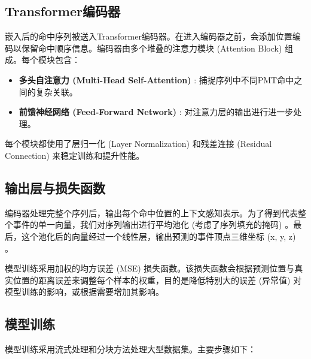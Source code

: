 \subsection{Transformer编码器}
嵌入后的命中序列被送入Transformer编码器。在进入编码器之前，会添加位置编码以保留命中顺序信息。编码器由多个堆叠的注意力模块 (Attention Block) 组成。每个模块包含：
\begin{itemize}
    \item \textbf{多头自注意力 (Multi-Head Self-Attention) }: 捕捉序列中不同PMT命中之间的复杂关联。
    \item \textbf{前馈神经网络 (Feed-Forward Network) }: 对注意力层的输出进行进一步处理。
\end{itemize}
每个模块都使用了层归一化 (Layer Normalization) 和残差连接 (Residual Connection) 来稳定训练和提升性能。

\subsection{输出层与损失函数}
编码器处理完整个序列后，输出每个命中位置的上下文感知表示。为了得到代表整个事件的单一向量，我们对序列输出进行平均池化 (考虑了序列填充的掩码) 。最后，这个池化后的向量经过一个线性层，输出预测的事件顶点三维坐标 (x, y, z) 。

模型训练采用加权的均方误差 (MSE) 损失函数。该损失函数会根据预测位置与真实位置的距离误差来调整每个样本的权重，目的是降低特别大的误差 (异常值) 对模型训练的影响，或根据需要增加其影响。

\subsection{模型训练}

模型训练采用流式处理和分块方法处理大型数据集。主要步骤如下：

